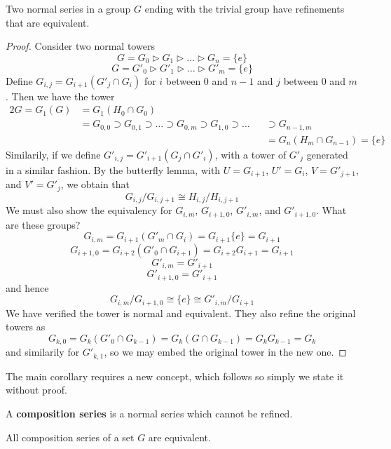 \begin{theorem}[Shreier]
    Two normal series in a group $G$ ending with the trivial group have refinements that are equivalent.
\end{theorem}
\begin{proof}
    Consider two normal towers
    \[ G = G_0 \rhd G_1 \rhd \dots \rhd G_n = \{ e \} \]
    \[ G = G'_0 \rhd G'_1 \rhd \dots \rhd G'_m = \{ e \} \]
    Define $G_{i,j} = G_{i+1}(G'_j \cap G_i)$ for $i$ between 0 and $n-1$ and $j$ between 0 and $m$. Then we have the tower
    \begin{alignat*}{2}
    G = G_1(G) &= G_1(H_0 \cap G_0) &\\
               &= G_{0,0} \supset G_{0,1} \supset \dots \supset G_{0,m} \supset G_{1,0} \supset \dots &&\supset G_{n-1,m}\\
                &           &&= G_n(H_m \cap G_{n-1}) = \{ e \}
    \end{alignat*}
    Similarily, if we define $G'_{i,j} = G'_{i+1}(G_j \cap G'_i)$, with a tower of $G'_j$ generated in a similar fashion. By the butterfly lemma, with $U = G_{i+1}$, $U' = G_i$, $V = G'_{j+1}$, and $V' = G'_j$, we obtain that
    \[ G_{i,j}/G_{i,j+1} \cong H_{i,j}/H_{i,j+1} \]
    We must also show the equivalency for $G_{i,m}$, $G_{i+1,0}$, $G'_{i,m}$, and $G'_{i+1,0}$. What are these groups?
    \[ G_{i,m} = G_{i+1}(G'_m \cap G_i) = G_{i+1}\{e\} = G_{i+1} \]
    \[ G_{i+1,0} = G_{i+2}(G'_0 \cap G_{i+1}) = G_{i+2}G_{i+1} = G_{i+1} \]
    \[ G'_{i,m} = G'_{i+1} \]
    \[ G'_{i+1,0} = G'_{i+1} \]
    and hence
    \[ G_{i,m}/G_{i+1,0} \cong \{e\} \cong G'_{i,m}/G_{i+1} \]
    We have verified the tower is normal and equivalent. They also refine the original towers as
    \[ G_{k,0} = G_k(G'_0 \cap G_{k-1}) = G_k(G \cap G_{k-1}) = G_kG_{k-1} = G_k \]
    and similarily for $G'_{k,1}$, so we may embed the original tower in the new one.
\end{proof}

The main corollary requires a new concept, which follows so simply we state it without proof.

\begin{definition}
    A {\bf composition series} is a normal series which cannot be refined.
\end{definition}

\begin{corollary}
    All composition series of a set $G$ are equivalent.
\end{corollary}

